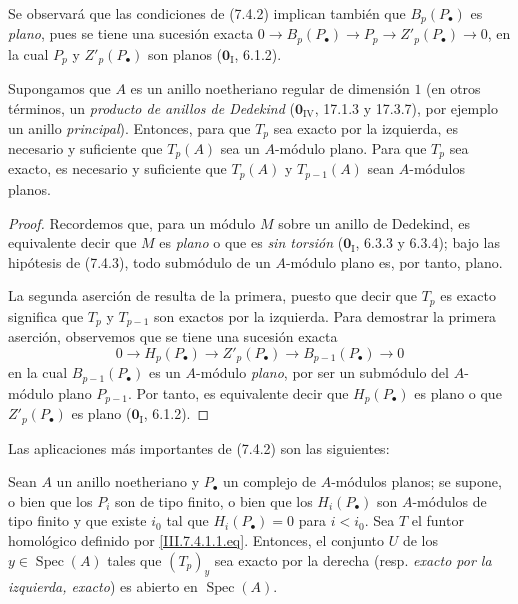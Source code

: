 Se observará que las condiciones de (7.4.2) implican también que
$B_p(P_\bullet)$ es \emph{plano}, pues se tiene una sucesión exacta
$0\longrightarrow B_p(P_\bullet)\longrightarrow P_p
\longrightarrow Z'_p(P_\bullet)\longrightarrow0$,
en la cual $P_p$ y $Z'_p(P_\bullet)$ son planos ($\mathbf{0}_{\mathrm I}$, 6.1.2).

\begin{corollary}[7.4.3]
\label{III.7.4.3}
Supongamos que $A$ es un anillo noetheriano regular de dimensión $1$
\textup{(en otros términos, un \emph{producto de anillos de Dedekind}
($\mathbf{0}_{\mathrm{IV}}$, 17.1.3 y 17.3.7), por ejemplo un anillo \emph{principal})}. Entonces,
para que $T_p$ sea exacto por la izquierda, es necesario y suficiente que
$T_p(A)$ sea un $A$-módulo plano. Para que $T_p$ sea exacto, es necesario y
suficiente que $T_p(A)$ y $T_{p-1}(A)$ sean $A$-módulos planos.
\end{corollary}

\begin{proof}
Recordemos que, para un módulo $M$ sobre un anillo de Dedekind, es equivalente
decir que $M$ es \emph{plano} o que es \emph{sin torsión} ($\mathbf{0}_{\mathrm I}$, 6.3.3 y
6.3.4); bajo las hipótesis de (7.4.3), todo submódulo de un $A$-módulo plano es, por tanto, plano.

La segunda aserción de  resulta de la primera, puesto que decir
que $T_p$ es exacto significa que $T_p$ y $T_{p-1}$ son exactos por la
izquierda. Para demostrar la primera aserción, observemos que se tiene una
sucesión exacta
\[
  0\longrightarrow H_p(P_\bullet)\longrightarrow Z'_p(P_\bullet)
  \longrightarrow B_{p-1}(P_\bullet)\longrightarrow0
\]
en la cual $B_{p-1}(P_\bullet)$ es un $A$-módulo \emph{plano}, por ser un submódulo
del $A$-módulo plano $P_{p-1}$. Por tanto, es equivalente decir que
$H_p(P_\bullet)$ es plano o que $Z'_p(P_\bullet)$ es plano
($\mathbf{0}_{\mathrm I}$, 6.1.2).
\end{proof}

Las aplicaciones más importantes de (7.4.2) son las siguientes:

\begin{proposition}[7.4.4]
\label{III.7.4.4}
Sean $A$ un anillo noetheriano y $P_\bullet$ un complejo de $A$-módulos
planos; se supone, o bien que los $P_i$ son de tipo finito, o bien que los
$H_i(P_\bullet)$ son $A$-módulos de tipo finito y que existe $i_0$ tal que
$H_i(P_\bullet)=0$ para $i<i_0$. Sea $T$ el funtor homológico definido por
\eqref{III.7.4.1.1.eq}. Entonces, el conjunto $U$ de los
$y\in\operatorname{Spec}(A)$ tales que $(T_p)_y$  sea exacto por la derecha
\textup{(resp. \emph{exacto por la izquierda, exacto})} es abierto en $\operatorname{Spec}(A)$.
\end{proposition}

